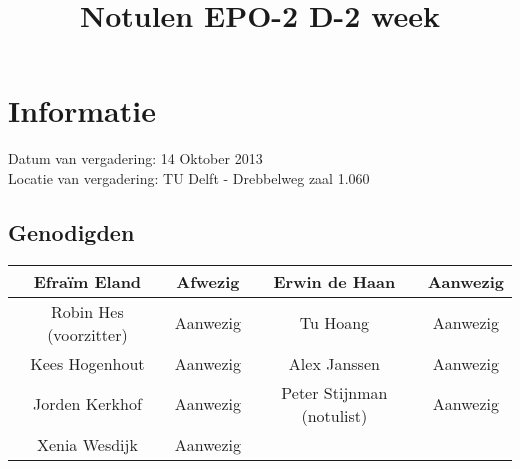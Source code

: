 \documentclass{article}
\begin{document}
\title{Notulen EPO-2 D-2 week }%
\author{}%
\maketitle

\section*{Informatie}
Datum van vergadering: 14 Oktober 2013 \\ %
Locatie van vergadering: TU Delft - Drebbelweg zaal 1.060 %
\subsection*{Genodigden}
\begin{center}
\begin{tabular}{|c |c | c| c|}
	\hline
Efraïm Eland & Afwezig & Erwin de Haan & Aanwezig \\
	\hline
Robin Hes (voorzitter) & Aanwezig & Tu Hoang & Aanwezig \\
	\hline
Kees Hogenhout & Aanwezig & Alex Janssen & Aanwezig\\
	\hline
Jorden Kerkhof & Aanwezig & Peter Stijnman (notulist) & Aanwezig \\
	\hline
Xenia Wesdijk & Aanwezig & & \\
	\hline
\end{tabular}
\end{center}
\end{document}

